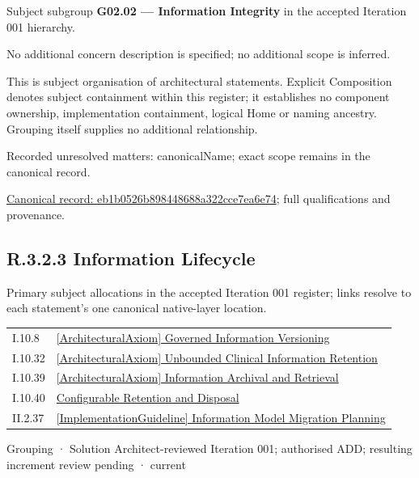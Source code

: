 Subject subgroup \textbf{G02.02 — Information Integrity} in the accepted Iteration 001 hierarchy.



No additional concern description is specified; no additional scope is inferred.



This is subject organisation of architectural statements. Explicit Composition denotes subject containment within this register; it establishes no component ownership, implementation containment, logical Home or naming ancestry. Grouping itself supplies no additional relationship.


{\small Recorded unresolved matters: canonicalName; exact scope remains in the canonical record.}\par
{\footnotesize \href{../../../../continuum/grouping/eb1b0526b898448688a322cce7ea6e74.md}{Canonical record: eb1b0526b898448688a322cce7ea6e74}; full qualifications and provenance.}\par
\subsection*{R.3.2.3 Information Lifecycle}
\label{navigation:R.3.2.3}

Primary subject allocations in the accepted Iteration 001 register; links resolve to each statement’s one canonical native-layer location.\par
\begin{longtable}{p{.22\linewidth}p{.73\linewidth}}
I.10.8 & \hyperref[element:2bd0132f072b42e9bf71bf483eb2deec]{[ArchitecturalAxiom] Governed Information Versioning} \\
I.10.32 & \hyperref[element:4c270732fecf4e79bb83c938861ce05b]{[ArchitecturalAxiom] Unbounded Clinical Information Retention} \\
I.10.39 & \hyperref[element:2429db4dbecc4a03a66f5189d76a6c38]{[ArchitecturalAxiom] Information Archival and Retrieval} \\
I.10.40 & \hyperref[element:b1a46fce85b4448fba55987af146d61e]{Configurable Retention and Disposal} \\
II.2.37 & \hyperref[element:4a2cd91fab0c42e98b09a017aefa66de]{[ImplementationGuideline] Information Model Migration Planning} \\
\end{longtable}
\label{element:b23f7fa8cb1b46569f63bde1aa5fbf1f}
{\small Grouping · Solution Architect-reviewed Iteration 001; authorised ADD; resulting increment review pending · current}\par

